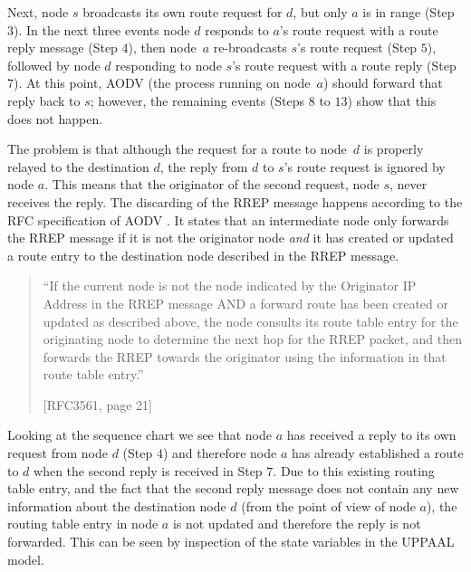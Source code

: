 \documentclass[conference,twoside]{IEEEtran}
\begin{document}
Next, node $s$ broadcasts its own route request for $d$, but only $a$ is in range (Step $3$). In the next three events node $d$ responds to $a$'s route request with a route reply message  (Step $4$), then node~$a$ re-broadcasts $s$'s route request (Step $5$), followed by node $d$ responding to node $s$'s route request with a route reply (Step $7$). At this point, AODV (the process running on node~$a$) should forward that reply back to  $s$; however, the remaining events (Steps $8$ to $13$) show that this does not happen.

The problem is that although the request for a route to node~$d$ is properly relayed to the destination $d$, the reply from  $d$ to $s$'s route request is ignored by node $a$. This means that the originator of the second request, node $s$, never receives the reply.  The discarding of the RREP message happens according to the RFC
specification of AODV \cite{rfc3561}. It states that an intermediate node
only forwards the RREP message if it is not the originator node
\emph{and} it has created or updated a route entry to the destination
node described in the RREP message.

\vspace{\abovedisplayskip}
\begin{quote}
\footnotesize{ \sf ``If the current node is not the node indicated by the Originator IP
   Address in the RREP message AND a forward route has been created or
   updated as described above, the node consults its route table entry
   for the originating node to determine the next hop for the RREP
   packet, and then forwards the RREP towards the originator using the
   information in that route table entry.''
   \begin{flushright}
   {[RFC3561, page 21]}
   \end{flushright} }
\end{quote}
\vspace{\belowdisplayskip}

Looking at the sequence chart we see that node $a$ has received a reply to its own request from
node $d$ (Step $4$) and therefore node $a$ has already established a route to $d$ when the
second reply is received in Step $7$. Due to this existing routing table entry, and the fact that the second reply message does not contain any new information about the destination node $d$ (from the point of view of node $a$),
the routing table entry in node $a$ is not updated and therefore the reply is not forwarded. This can be seen
by inspection of the state variables in the UPPAAL model.
\end{document}
